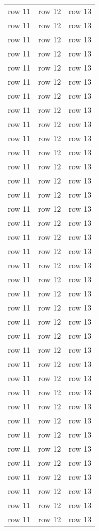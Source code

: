 \documentclass[a4paper, 11pt]{article}
\begin{document}
\begin{center}
\begin{longtable}{| c | c | c |}
    row 11 & row 12 & row 13\\
    row 11 & row 12 & row 13\\
    row 11 & row 12 & row 13\\
    row 11 & row 12 & row 13\\
    row 11 & row 12 & row 13\\
    row 11 & row 12 & row 13\\
    row 11 & row 12 & row 13\\
    row 11 & row 12 & row 13\\
    row 11 & row 12 & row 13\\
    row 11 & row 12 & row 13\\
    row 11 & row 12 & row 13\\
    row 11 & row 12 & row 13\\
    row 11 & row 12 & row 13\\
    row 11 & row 12 & row 13\\
    row 11 & row 12 & row 13\\
    row 11 & row 12 & row 13\\
    row 11 & row 12 & row 13\\
    row 11 & row 12 & row 13\\
    row 11 & row 12 & row 13\\
    row 11 & row 12 & row 13\\
    row 11 & row 12 & row 13\\
    row 11 & row 12 & row 13\\
    row 11 & row 12 & row 13\\
    row 11 & row 12 & row 13\\
    row 11 & row 12 & row 13\\
    row 11 & row 12 & row 13\\
    row 11 & row 12 & row 13\\
    row 11 & row 12 & row 13\\
    row 11 & row 12 & row 13\\
    row 11 & row 12 & row 13\\
    row 11 & row 12 & row 13\\
    row 11 & row 12 & row 13\\
    row 11 & row 12 & row 13\\
    row 11 & row 12 & row 13\\
    row 11 & row 12 & row 13\\
    row 11 & row 12 & row 13\\
    row 11 & row 12 & row 13\\

\end{longtable}
\end{center}
\end{document}

